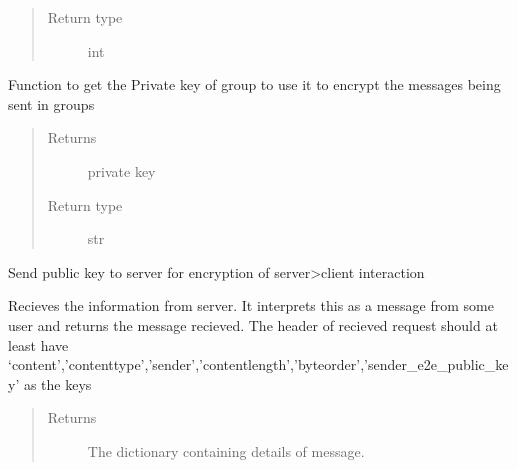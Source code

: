 \documentclass[letterpaper,10pt,english]{sphinxmanual}
\begin{document}
\begin{fulllineitems}
\begin{fulllineitems}
\begin{quote}
\begin{description}
\item[{Return type}] \leavevmode
int

\end{description}\end{quote}

\end{fulllineitems}


\begin{fulllineitems}
\label{\detokenize{Message:Message.Message._create_group_key}}
Function to get the Private key of group to use it to encrypt the messages being sent in groups
\begin{quote}\begin{description}
\item[{Returns}] \leavevmode
private key

\item[{Return type}] \leavevmode
str

\end{description}\end{quote}

\end{fulllineitems}


\begin{fulllineitems}
\label{\detokenize{Message:Message.Message._keyex}}
Send public key to server for encryption of server\sphinxhyphen{}\textgreater{}client interaction

\end{fulllineitems}


\begin{fulllineitems}
\label{\detokenize{Message:Message.Message._recvmsg}}
Recieves the information from server. It interprets this as a message from some user and returns the message recieved. The header of recieved request should at least have ‘content’,’content\sphinxhyphen{}type’,’sender’,’content\sphinxhyphen{}length’,’byteorder’,’sender\_e2e\_public\_key’ as the keys
\begin{quote}\begin{description}
\item[{Returns}] \leavevmode
The dictionary containing details of message.


\end{description}
\end{quote}
\end{fulllineitems}
\end{fulllineitems}
\end{document}
